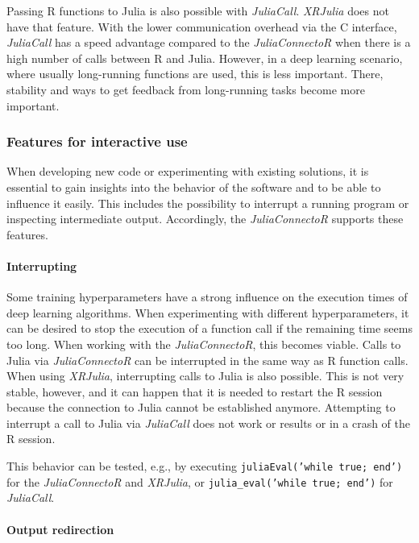 \documentclass[12pt]{article}
\newcommand{\inlinecode}[1]{\texttt{#1}}
\newcommand{\apkg}[1]{\emph{#1}}
\begin{document}
Passing R functions to Julia is also possible with \apkg{JuliaCall}.
\apkg{XRJulia} does not have that feature. 
With the lower communication overhead via the C interface, \apkg{JuliaCall} has a speed advantage compared to the \apkg{JuliaConnectoR} when there is a high number of calls between R and Julia.
However, in a deep learning scenario, where usually long-running functions are used, this is less important.
There, stability and ways to get feedback from long-running tasks become more important.

\subsubsection{Features for interactive use}

When developing new code or experimenting with existing solutions, it is essential to gain insights into the behavior of the software and to be able to influence it easily.
This includes the possibility to interrupt a running program or inspecting intermediate output.
Accordingly, the \apkg{JuliaConnectoR} supports these features.

\paragraph{Interrupting}\label{juliaconnectorinterrupting}

Some training hyperparameters have a strong influence on the execution times of deep learning algorithms.
When experimenting with different hyperparameters, it can be desired to stop the execution of a function call if the remaining time seems too long.
When working with the \apkg{JuliaConnectoR}, this becomes viable.
Calls to Julia via \apkg{JuliaConnectoR} can be interrupted in the same way as R function calls.
When using \apkg{XRJulia}, interrupting calls to Julia is also possible.
This is not very stable, however, and it can happen that it is needed to restart the R session because the connection to Julia cannot be established anymore.
Attempting to interrupt a call to Julia via \apkg{JuliaCall} does not work or results or in a crash of the R session.

This behavior can be tested, e.g., by executing \inlinecode{juliaEval('while true; end')} for the \apkg{JuliaConnectoR} and \apkg{XRJulia}, or \inlinecode{julia\_eval('while true; end')} for \apkg{JuliaCall}.

\paragraph{Output redirection}\label{juliaconnectorOutput}
\end{document}
